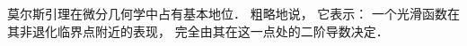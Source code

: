 
\begin{issues}
\issueTODO
\issueDraft
\end{issues}


莫尔斯引理在微分几何学中占有基本地位． 粗略地说， 它表示： 一个光滑函数在其非退化临界点附近的表现， 完全由其在这一点处的二阶导数决定． 